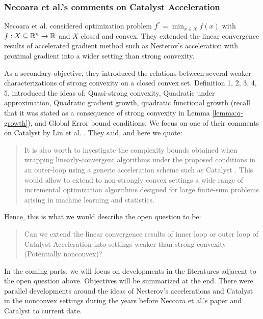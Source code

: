 \documentclass[12pt]{article}
\begin{document}
        \subsubsection{Necoara et al.'s comments on Catalyst Acceleration}
            Necoara et al. \cite{necoara_linear_2019} considered optimization problem $f^* = \min_{x \in X} f(x)$ with $f: X \subseteq \mathbb R^n \rightarrow \mathbb R$ and $X$ closed and convex. 
            They extended the linear convergence results of accelerated gradient method such as Nesterov's acceleration with proximal gradient into a wider setting than strong convexity. 
            \par
            As a secondary objective, they introduced the relations between several weaker characterizations of strong convexity on a closed convex set. 
            Definition 1, 2, 3, 4, 5, introduced the ideas of: Quasi-strong convexity, Quadratic under approximation, Quadratic gradient growth, quadratic functional growth (recall that it was stated as a consequence of strong convexity in Lemma \ref{lemma:q-growth}), and Global Error bound conditions. 
            We focus on one of their comments on Catalyst by Lin et al. \cite{lin_universal_2015}. 
            They said, and here we quote: 
            \begin{quote}
                It is also worth to investigate the complexity bounds obtained when wrapping linearly-convergent algorithms under the proposed conditions in an outer-loop using a generic acceleration scheme such as Catalyst \cite{lin_universal_2015}. 
                This would allow to extend to non-strongly convex settings a wide range of incremental optimization algorithms designed for large finite-sum problems arising in machine learning and statistics.
            \end{quote}
            Hence, this is what we would describe the open question to be: 
            \begin{quote}
                Can we extend the linear convergence results of inner loop or outer loop of Catalyst Acceleration into settings weaker than strong convexity (Potentially nonconvex)? 
            \end{quote}
            In the coming parts, we will focus on developments in the literatures adjacent to the open question above. 
            Objectives will be summarized at the end. 
            There were parallel developments around the ideas of Nesterov's accelerations and Catalyst in the nonconvex settings during the years before Necoara et al.'s paper and Catalyst to current date. 
\end{document}
